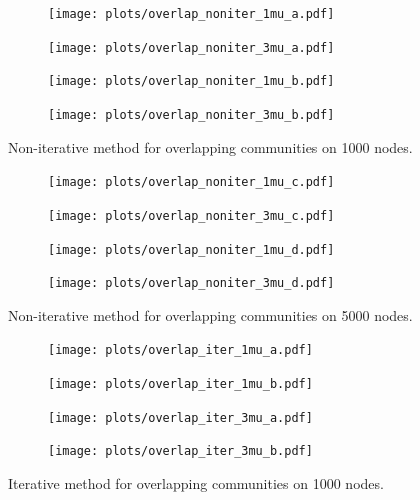 \begin{figure}[h!]
    \centering
    \begin{subfigure}{0.4\textwidth}
    \centering
    \texttt{[image: plots/overlap\_noniter\_1mu\_a.pdf]}
    \end{subfigure}%
    \begin{subfigure}{0.4\textwidth}
    \centering
    \texttt{[image: plots/overlap\_noniter\_3mu\_a.pdf]}
    \end{subfigure}
    \begin{subfigure}{0.4\textwidth}
    \centering
    \texttt{[image: plots/overlap\_noniter\_1mu\_b.pdf]}
    \end{subfigure}%
    \begin{subfigure}{0.4\textwidth}
    \centering
    \texttt{[image: plots/overlap\_noniter\_3mu\_b.pdf]}
    \end{subfigure}
    \caption{Non-iterative method for overlapping communities on 1000 nodes.}\label{fig:no_iter_overlap_1000N}
\end{figure}
%
\begin{figure}[h!]
    \centering
    \begin{subfigure}{0.4\textwidth}
    \centering
    \texttt{[image: plots/overlap\_noniter\_1mu\_c.pdf]}
    \end{subfigure}%
    \begin{subfigure}{0.4\textwidth}
    \centering
    \texttt{[image: plots/overlap\_noniter\_3mu\_c.pdf]}
    \end{subfigure}
    \begin{subfigure}{0.4\textwidth}
    \centering
    \texttt{[image: plots/overlap\_noniter\_1mu\_d.pdf]}
    \end{subfigure}%
    \begin{subfigure}{0.4\textwidth}
    \centering
    \texttt{[image: plots/overlap\_noniter\_3mu\_d.pdf]}
    \end{subfigure}
    \caption{Non-iterative method for overlapping communities on 5000 nodes.}\label{fig:no_iter_overlap_5000N}
\end{figure}
%
\begin{figure}[h!]
    \centering
    \begin{subfigure}{0.4\textwidth}
    \centering
    \texttt{[image: plots/overlap\_iter\_1mu\_a.pdf]}
    \end{subfigure}%
    \begin{subfigure}{0.4\textwidth}
    \centering
    \texttt{[image: plots/overlap\_iter\_1mu\_b.pdf]}
    \end{subfigure}
    \begin{subfigure}{0.4\textwidth}
    \centering
    \texttt{[image: plots/overlap\_iter\_3mu\_a.pdf]}
    \end{subfigure}%
    \begin{subfigure}{0.4\textwidth}
    \centering
    \texttt{[image: plots/overlap\_iter\_3mu\_b.pdf]}
    \end{subfigure}
    \caption{Iterative method for overlapping communities on 1000 nodes.}\label{fig:iter_overlap_1000N}
\end{figure}
